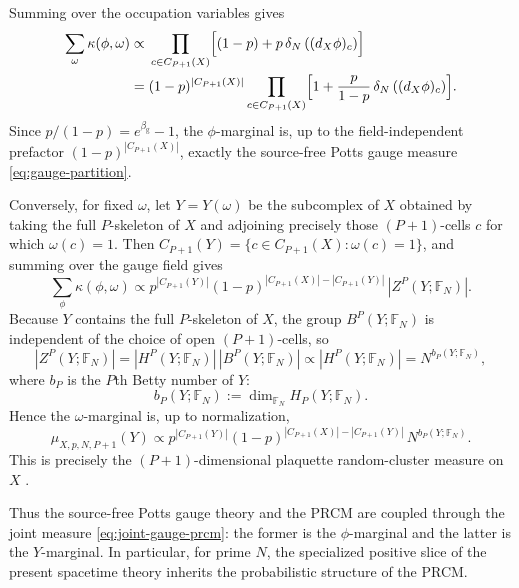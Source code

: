 \documentclass[dvipsnames,a4paper]{article}
\numberwithin{equation}{section}
\theoremstyle{definition}
\theoremstyle{remark}
\begin{document}
Summing over the occupation variables gives
\begin{equation}
\begin{aligned}
	\sum_{\omega}\kappa(\phi,\omega)
	\propto&\;
	\prod_{c\in C_{P+1}(X)}
	\Bigl[(1-p)+p\,\delta_N\left((d_X\phi)_c\right)\Bigr]
	\\=&\;
	(1-p)^{|C_{P+1}(X)|}
	\prod_{c\in C_{P+1}(X)}
	\Bigl[
	1+\frac{p}{1-p}\,\delta_N\left((d_X\phi)_c\right)
	\Bigr].
\end{aligned}
\end{equation}
Since \(p/(1-p)=e^{\beta_{\mathrm g}}-1\), the \(\phi\)-marginal is, up to the
field-independent prefactor \((1-p)^{|C_{P+1}(X)|}\), exactly the source-free
Potts gauge measure \eqref{eq:gauge-partition}.

Conversely, for fixed \(\omega\), let \(Y=Y(\omega)\) be the subcomplex of \(X\)
obtained by taking the full \(P\)-skeleton of \(X\) and adjoining precisely
those \((P+1)\)-cells \(c\) for which \(\omega(c)=1\). Then
\(C_{P+1}(Y)=\{c\in C_{P+1}(X):\omega(c)=1\}\), and summing over the gauge field
gives
\begin{equation}
	\sum_{\phi}\kappa(\phi,\omega)
	\propto
	p^{|C_{P+1}(Y)|}(1-p)^{|C_{P+1}(X)|-|C_{P+1}(Y)|}\,
	|Z^P(Y;\mathbb F_N)|.
\end{equation}
Because \(Y\) contains the full \(P\)-skeleton of \(X\), the group
\(B^P(Y;\mathbb F_N)\) is independent of the choice of open \((P+1)\)-cells, so
\begin{equation}
	|Z^P(Y;\mathbb F_N)|
	=
	|H^P(Y;\mathbb F_N)|\,|B^P(Y;\mathbb F_N)|
	\propto
	|H^P(Y;\mathbb F_N)|
	=
	N^{b_P(Y;\mathbb F_N)},
\end{equation}
where $b_P$ is the $P$th Betty number of $Y$:
\begin{equation}
	b_P(Y;\mathbb F_N):=\dim_{\mathbb F_N}H_P(Y;\mathbb F_N).
\end{equation}
Hence the \(\omega\)-marginal is, up to normalization,
\begin{equation}
	\mu_{X,p,N,P+1}(Y)
	\propto
	p^{|C_{P+1}(Y)|}(1-p)^{|C_{P+1}(X)|-|C_{P+1}(Y)|}\,
	N^{b_P(Y;\mathbb F_N)}.
	\label{eq:prcm-measure}
\end{equation}
This is precisely the \((P+1)\)-dimensional plaquette random-cluster measure on
\(X\) \cite{HiraokaShirai2016}.

Thus the source-free Potts gauge theory and the PRCM
are coupled through the joint measure \eqref{eq:joint-gauge-prcm}: the former
is the \(\phi\)-marginal and the latter is the \(Y\)-marginal. In particular,
for prime \(N\), the specialized positive slice of the present spacetime theory
inherits the probabilistic structure of the PRCM.
\end{document}
